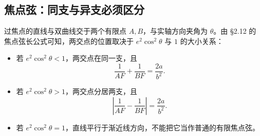 \documentclass[UTF8,zihao=-4,a4paper]{ctexart}
\newcommand{\abs}[1]{\left|#1\right|}
\begin{document}
\subsection{焦点弦：同支与异支必须区分}

过焦点的直线与双曲线交于两个有限点 $A,B$，与实轴方向夹角为 $\theta$。由 §2.12 的焦点弦长公式可知，两交点的位置取决于 $e^2\cos^2\theta$ 与 $1$ 的大小关系：
\begin{itemize}
\item 若 $e^2\cos^2\theta<1$，两交点在同一支，且
\[
\boxed{\frac1{AF}+\frac1{BF}=\frac{2a}{b^2}}.
\]
\item 若 $e^2\cos^2\theta>1$，两交点分居两支，且
\[
\boxed{\abs{\frac1{AF}-\frac1{BF}}=\frac{2a}{b^2}}.
\]
\item 若 $e^2\cos^2\theta=1$，直线平行于渐近线方向，不能把它当作普通的有限焦点弦。
\end{itemize}
\end{document}
